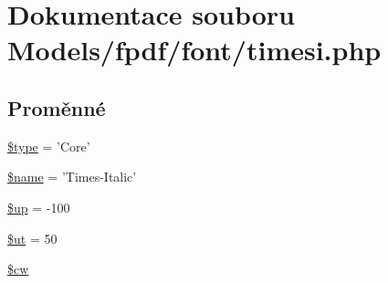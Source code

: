\hypertarget{timesi_8php}{\section{Dokumentace souboru Models/fpdf/font/timesi.php}
\label{timesi_8php}
}
\subsection*{Proměnné}
\begin{DoxyCompactItemize}
\item 
\hyperlink{timesi_8php_a9a4a6fba2208984cabb3afacadf33919}{\$type} = 'Core'
\item 
\hyperlink{timesi_8php_ab2fc40d43824ea3e1ce5d86dee0d763b}{\$name} = 'Times-\/Italic'
\item 
\hyperlink{timesi_8php_a6b5ad2ac55f9df46e8f34e78fbd6f176}{\$up} = -\/100
\item 
\hyperlink{timesi_8php_aadd3f841051043ee58e587e840e8dd0b}{\$ut} = 50
\item 
\hyperlink{timesi_8php_ac2951b03dbb0317e6c61ec920b7479dc}{\$cw}
\end{DoxyCompactItemize}


